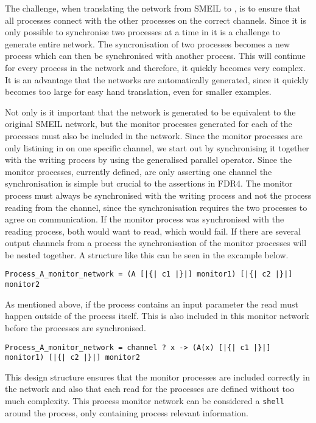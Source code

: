 The challenge, when translating the network from SMEIL to \cspm{}, is to ensure that all processes connect with the other processes on the correct channels.
Since it is only possible to synchronise two processes at a time in \cspm{} it is a challenge to generate entire network. The syncronisation of two processes becomes a new process which can then be synchronised with another process. This will continue for every process in the network and therefore, it quickly becomes very complex. It is an advantage that the \cspm{} networks are automatically generated, since it quickly becomes too large for easy hand translation, even for smaller examples.

Not only is it important that the network is generated to be equivalent to the original SMEIL network, but the monitor processes generated for each of the \cspm{} processes must also be included in the network. Since the monitor processes are only listining in on one specific channel, we start out by synchronising it together with the writing process by using the generalised parallel operator. Since the monitor processes, currently defined, are only asserting one channel the synchronisation is simple but crucial to the assertions in FDR4.
The monitor process must always be synchronised with the writing process and not the process reading from the channel, since the synchronisation requires the two processes to agree on communication. If the monitor process was synchronised with the reading process, both would want to read, which would fail.
If there are several output channels from a process the synchronisation of the monitor processes will be nested together. A structure like this can be seen in the excample below.
\begin{verbatim}
Process_A_monitor_network = (A [|{| c1 |}|] monitor1) [|{| c2 |}|] monitor2
\end{verbatim}
As mentioned above, if the process contains an input parameter the read must happen outside of the process itself. This is also included in this monitor network before the processes are synchronised.
\begin{verbatim}
Process_A_monitor_network = channel ? x -> (A(x) [|{| c1 |}|] monitor1) [|{| c2 |}|] monitor2
\end{verbatim}
This design structure ensures that the monitor processes are included correctly in the network and also that each read for the processes are defined without too much complexity. This process monitor network can be considered a \texttt{shell} around the process, only containing process relevant information.

